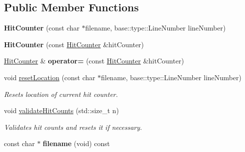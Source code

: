 \subsection*{Public Member Functions}
\begin{DoxyCompactItemize}
\item 
\hypertarget{classel_1_1base_1_1HitCounter_a181f80b297ce35070f2d2ddd50c99aa6}{{\bfseries Hit\-Counter} (const char $\ast$filename, base\-::type\-::\-Line\-Number line\-Number)}\label{classel_1_1base_1_1HitCounter_a181f80b297ce35070f2d2ddd50c99aa6}

\item 
\hypertarget{classel_1_1base_1_1HitCounter_abae187cf5ea0f94e812223ee4be7061f}{{\bfseries Hit\-Counter} (const \hyperlink{classel_1_1base_1_1HitCounter}{Hit\-Counter} \&hit\-Counter)}\label{classel_1_1base_1_1HitCounter_abae187cf5ea0f94e812223ee4be7061f}

\item 
\hypertarget{classel_1_1base_1_1HitCounter_ad32a5e5c2a63ff30fa9d298613d746d1}{\hyperlink{classel_1_1base_1_1HitCounter}{Hit\-Counter} \& {\bfseries operator=} (const \hyperlink{classel_1_1base_1_1HitCounter}{Hit\-Counter} \&hit\-Counter)}\label{classel_1_1base_1_1HitCounter_ad32a5e5c2a63ff30fa9d298613d746d1}

\item 
\hypertarget{classel_1_1base_1_1HitCounter_a56f5a7450080d31b8d54c2be877b8597}{void \hyperlink{classel_1_1base_1_1HitCounter_a56f5a7450080d31b8d54c2be877b8597}{reset\-Location} (const char $\ast$filename, base\-::type\-::\-Line\-Number line\-Number)}\label{classel_1_1base_1_1HitCounter_a56f5a7450080d31b8d54c2be877b8597}

\begin{DoxyCompactList}\small\item\em Resets location of current hit counter. \end{DoxyCompactList}\item 
\hypertarget{classel_1_1base_1_1HitCounter_a04dcca0a3f1b1f9a0ef8d812f00cecf0}{void \hyperlink{classel_1_1base_1_1HitCounter_a04dcca0a3f1b1f9a0ef8d812f00cecf0}{validate\-Hit\-Counts} (std\-::size\-\_\-t n)}\label{classel_1_1base_1_1HitCounter_a04dcca0a3f1b1f9a0ef8d812f00cecf0}

\begin{DoxyCompactList}\small\item\em Validates hit counts and resets it if necessary. \end{DoxyCompactList}\item 
\hypertarget{classel_1_1base_1_1HitCounter_ad04433d214c175775ed61453ead374fc}{const char $\ast$ {\bfseries filename} (void) const }\label{classel_1_1base_1_1HitCounter_ad04433d214c175775ed61453ead374fc}


\end{DoxyCompactItemize}
